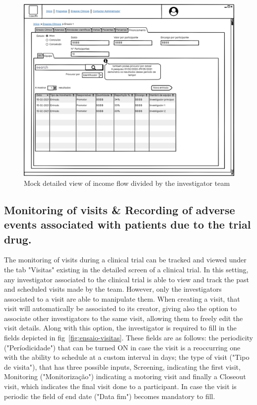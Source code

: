 \begin{figure}[H]
    \centering
    \includegraphics[scale=0.35]{images/ensaio-finance-team.png}
    \caption{Mock detailed view of income flow divided by the investigator team}
    \label{fig:ensaio-finance-team}
\end{figure}

\subsection{Monitoring of visits \& Recording of adverse events associated with patients due to the trial drug.} 
The monitoring of visits during a clinical trial can be tracked and viewed under the tab "Visitas" existing in the detailed screen of a clinical trial.
In this setting, any investigator associated to the clinical trial is able to view and track the past and scheduled visits made by the team. However, only the investigators associated to a visit are able to manipulate them. When creating a visit, that visit will automatically be associated to its creator, giving also the option to associate other investigators to the same visit, allowing them to freely edit the visit details. Along with this option, the investigator is required to fill in the fields depicted in fig~\ref{fig:ensaio-visitas}. These fields are as follows: the periodicity ("Períodicidade") that can be turned ON in case the visit is a reoccurring one with the ability to schedule at a custom interval in days; the type of visit ("Tipo de visita"), that has three possible inputs, Screening, indicating the first visit, Monitoring ("Monitorização") indicating a motoring visit and finally a Closeout visit, which indicates the final visit done to a participant. In case the visit is periodic the field of end date ("Data fim") becomes mandatory to fill.  

